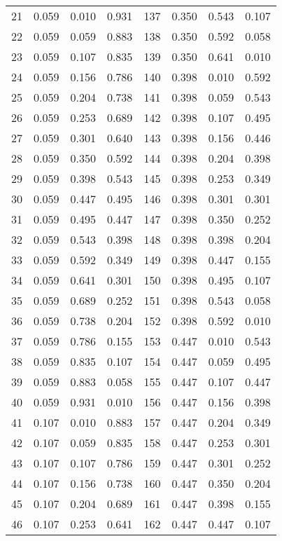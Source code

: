\documentclass[journal=mamobx,manuscript=suppinfo]{achemso}
\begin{document}
\begin{longtable}{cccc|cccc}
21 & 0.059 & 0.010 & 0.931  & 137 & 0.350 & 0.543 & 0.107 \\
22 & 0.059 & 0.059 & 0.883  & 138 & 0.350 & 0.592 & 0.058 \\
23 & 0.059 & 0.107 & 0.835  & 139 & 0.350 & 0.641 & 0.010 \\
24 & 0.059 & 0.156 & 0.786  & 140 & 0.398 & 0.010 & 0.592 \\
25 & 0.059 & 0.204 & 0.738  & 141 & 0.398 & 0.059 & 0.543 \\
26 & 0.059 & 0.253 & 0.689  & 142 & 0.398 & 0.107 & 0.495 \\
27 & 0.059 & 0.301 & 0.640  & 143 & 0.398 & 0.156 & 0.446 \\
28 & 0.059 & 0.350 & 0.592  & 144 & 0.398 & 0.204 & 0.398 \\
29 & 0.059 & 0.398 & 0.543  & 145 & 0.398 & 0.253 & 0.349 \\
30 & 0.059 & 0.447 & 0.495  & 146 & 0.398 & 0.301 & 0.301 \\
31 & 0.059 & 0.495 & 0.447  & 147 & 0.398 & 0.350 & 0.252 \\
32 & 0.059 & 0.543 & 0.398  & 148 & 0.398 & 0.398 & 0.204 \\
33 & 0.059 & 0.592 & 0.349  & 149 & 0.398 & 0.447 & 0.155 \\
34 & 0.059 & 0.641 & 0.301  & 150 & 0.398 & 0.495 & 0.107 \\
35 & 0.059 & 0.689 & 0.252  & 151 & 0.398 & 0.543 & 0.058 \\
36 & 0.059 & 0.738 & 0.204  & 152 & 0.398 & 0.592 & 0.010 \\
37 & 0.059 & 0.786 & 0.155  & 153 & 0.447 & 0.010 & 0.543 \\
38 & 0.059 & 0.835 & 0.107  & 154 & 0.447 & 0.059 & 0.495 \\
39 & 0.059 & 0.883 & 0.058  & 155 & 0.447 & 0.107 & 0.447 \\
40 & 0.059 & 0.931 & 0.010  & 156 & 0.447 & 0.156 & 0.398 \\
41 & 0.107 & 0.010 & 0.883  & 157 & 0.447 & 0.204 & 0.349 \\
42 & 0.107 & 0.059 & 0.835  & 158 & 0.447 & 0.253 & 0.301 \\
43 & 0.107 & 0.107 & 0.786  & 159 & 0.447 & 0.301 & 0.252 \\
44 & 0.107 & 0.156 & 0.738  & 160 & 0.447 & 0.350 & 0.204 \\
45 & 0.107 & 0.204 & 0.689  & 161 & 0.447 & 0.398 & 0.155 \\
46 & 0.107 & 0.253 & 0.641  & 162 & 0.447 & 0.447 & 0.107 \\

\end{longtable}
\end{document}
